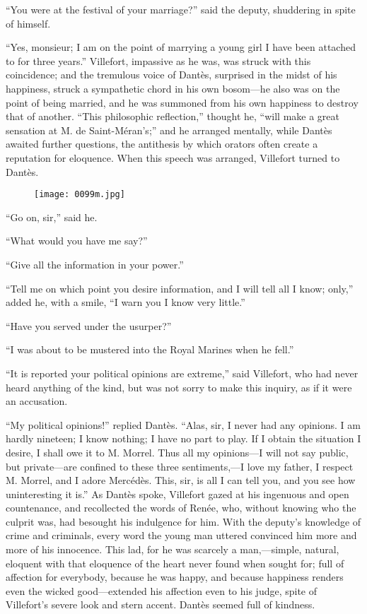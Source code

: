 “You were at the festival of your marriage?” said the deputy,
shuddering in spite of himself.

“Yes, monsieur; I am on the point of marrying a young girl I have been
attached to for three years.” Villefort, impassive as he was, was
struck with this coincidence; and the tremulous voice of Dantès,
surprised in the midst of his happiness, struck a sympathetic chord in
his own bosom—he also was on the point of being married, and he was
summoned from his own happiness to destroy that of another. “This
philosophic reflection,” thought he, “will make a great sensation at M.
de Saint-Méran’s;” and he arranged mentally, while Dantès awaited
further questions, the antithesis by which orators often create a
reputation for eloquence. When this speech was arranged, Villefort
turned to Dantès.

\begin{figure}[ht]
\texttt{[image: 0099m.jpg]}
\end{figure}

“Go on, sir,” said he.

“What would you have me say?”

“Give all the information in your power.”

“Tell me on which point you desire information, and I will tell all I
know; only,” added he, with a smile, “I warn you I know very little.”

“Have you served under the usurper?”

“I was about to be mustered into the Royal Marines when he fell.”

“It is reported your political opinions are extreme,” said Villefort,
who had never heard anything of the kind, but was not sorry to make
this inquiry, as if it were an accusation.

“My political opinions!” replied Dantès. “Alas, sir, I never had any
opinions. I am hardly nineteen; I know nothing; I have no part to play.
If I obtain the situation I desire, I shall owe it to M. Morrel. Thus
all my opinions—I will not say public, but private—are confined to
these three sentiments,—I love my father, I respect M. Morrel, and I
adore Mercédès. This, sir, is all I can tell you, and you see how
uninteresting it is.” As Dantès spoke, Villefort gazed at his ingenuous
and open countenance, and recollected the words of Renée, who, without
knowing who the culprit was, had besought his indulgence for him. With
the deputy’s knowledge of crime and criminals, every word the young man
uttered convinced him more and more of his innocence. This lad, for he
was scarcely a man,—simple, natural, eloquent with that eloquence of
the heart never found when sought for; full of affection for everybody,
because he was happy, and because happiness renders even the wicked
good—extended his affection even to his judge, spite of Villefort’s
severe look and stern accent. Dantès seemed full of kindness.

